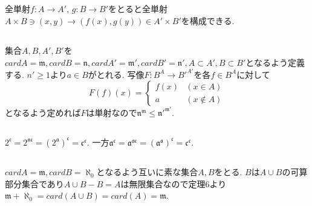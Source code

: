 \documentclass{jsarticle}
\begin{document}
\subsection{} %
全単射$f:A \rightarrow A'$, $g:B \rightarrow B'$をとると全単射$A \times B \ni (x, y) \rightarrow (f(x), g(y)) \in A' \times B'$を構成できる.

\subsection{} %
集合$A, B, A', B'$を$card A = \mathfrak{m}, card B = \mathfrak{n}, card A' = \mathfrak{m'}, card B' = \mathfrak{n'}, A \subset A', B \subset B'$となるよう定義する. $n' \ge 1$より$a \in B$がとれる. 写像$F:B^A \rightarrow B'^{A'}$を各$f \in B^A$に対して
\begin{equation*}
	F(f)(x) = \begin{cases}
		f(x) & (x \in A)\\
		a & (x \notin A)
	\end{cases}
\end{equation*}
となるよう定めれば$F$は単射なので$\mathfrak{n}^\mathfrak{m} \le \mathfrak{n'}^\mathfrak{m'}$.

\subsection{} %
$2^\mathfrak{c} = 2^\mathfrak{ac} = (2^\mathfrak{a})^\mathfrak{c} = \mathfrak{c}^\mathfrak{c}$.
一方$\mathfrak{a}^\mathfrak{c} = \mathfrak{a}^\mathfrak{ac} = (\mathfrak{a}^\mathfrak{a})^\mathfrak{c} = \mathfrak{c}^\mathfrak{c}$.

\subsection{} %
$card A = \mathfrak{m}, card B = \aleph_0$となるよう互いに素な集合$A, B$をとる. $B$は$A \cup B$の可算部分集合であり$A \cup B - B = A$は無限集合なので定理6より$\mathfrak{m} + \aleph_0 = card(A \cup B) = card(A) = \mathfrak{m}$.
\end{document}
